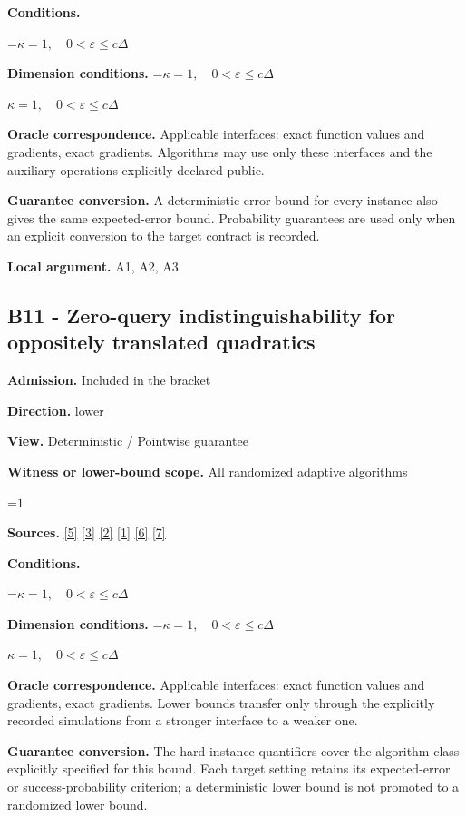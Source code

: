 \documentclass[10pt,a4paper]{article}
\newcommand{\AtlasMath}[1]{\par\begingroup\centering\setbox0=\hbox{$\displaystyle #1$}\ifdim\wd0>1.4\linewidth\typeout{ATLAS WIDE FORMULA: \the\wd0}\fi\ifdim\wd0>\linewidth\resizebox{\linewidth}{!}{\box0}\else\box0\fi\par\endgroup}
\newcommand{\AtlasInlineMath}[1]{\begingroup\setbox0=\hbox{$#1$}\ifdim\wd0>.4\linewidth\endgroup\AtlasMath{#1}\else\endgroup$#1$\fi}
\begin{document}
\textbf{Conditions.} 
\AtlasMath{\kappa=1,\quad0<\varepsilon\le c\Delta}


\textbf{Dimension conditions.} \AtlasInlineMath{\kappa=1,\quad0<\varepsilon\le c\Delta}

\textbf{Oracle correspondence.} Applicable interfaces: exact function values and gradients, exact gradients. Algorithms may use only these interfaces and the auxiliary operations explicitly declared public.

\textbf{Guarantee conversion.} A deterministic error bound for every instance also gives the same expected-error bound. Probability guarantees are used only when an explicit conversion to the target contract is recorded.

\textbf{Local argument.} A1, A2, A3

\subsection{B11 - Zero-query indistinguishability for oppositely translated quadratics}
\textbf{Admission.} Included in the bracket

\textbf{Direction.} lower

\textbf{View.} Deterministic / Pointwise guarantee

\textbf{Witness or lower-bound scope.} All randomized adaptive algorithms

\AtlasMath{1}
\textbf{Sources.} \href{https://arxiv.org/pdf/2101.09740v2}{[5]} \href{https://arxiv.org/pdf/2609.33360v2}{[3]} \href{https://arxiv.org/pdf/2609.10874}{[2]} \href{https://arxiv.org/pdf/1405.4980}{[1]} \href{https://www2.isye.gatech.edu/~nemirovs/MOR_AccuracyCertificates.pdf}{[6]} \href{https://arxiv.org/pdf/2609.20701}{[7]}

\textbf{Conditions.} 
\AtlasMath{\kappa=1,\quad0<\varepsilon\le c\Delta}


\textbf{Dimension conditions.} \AtlasInlineMath{\kappa=1,\quad0<\varepsilon\le c\Delta}

\textbf{Oracle correspondence.} Applicable interfaces: exact function values and gradients, exact gradients. Lower bounds transfer only through the explicitly recorded simulations from a stronger interface to a weaker one.

\textbf{Guarantee conversion.} The hard-instance quantifiers cover the algorithm class explicitly specified for this bound. Each target setting retains its expected-error or success-probability criterion; a deterministic lower bound is not promoted to a randomized lower bound.
\end{document}
